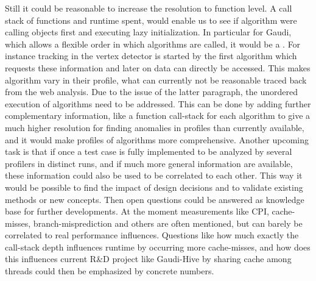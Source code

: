\documentclass[a4paper]{jpconf}
\begin{document}
Still it could be reasonable to increase the resolution to function level. A call stack of functions and runtime spent, would enable us to see if algorithm were calling objects first and executing lazy initialization. In particular for Gaudi, which allows a flexible order in which algorithms are called, it would be a . For instance tracking in the vertex detector is started by the first algorithm which requests these information and later on data can directly be accessed. This makes algorithm vary in their profile, what can currently not be reasonable traced back from the web analysis.
\newline
Due to the issue of the latter paragraph, the unordered execution of algorithms need to be addressed. This can be done by adding further complementary information, like a function call-stack for each algorithm to give a much higher resolution for finding anomalies in profiles than currently available, and it would make profiles of algorithms more comprehensive.
\newline
Another upcoming task is that if once a test case is fully implemented to be analyzed by several profilers in distinct runs, and if much more general information are available, these information could also be used to be correlated to each other. This way it would be possible to find the impact of design decisions and to validate existing methods or new concepts. Then open questions could be answered as knowledge base for further developments.
\newline
At the moment measurements like CPI, cache-misses, branch-misprediction and others are often mentioned, but can barely be correlated to real performance influences. Questions like how much exactly the call-stack depth influences runtime by occurring more cache-misses, and how does this influences current R\&D project like Gaudi-Hive by sharing cache among threads could then be emphasized by concrete numbers.
\end{document}
